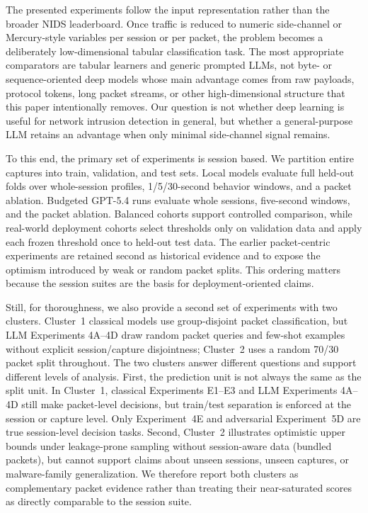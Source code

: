 \documentclass[letterpaper,twocolumn,10pt]{article}
\begin{document}
The presented experiments follow the input representation rather than the broader NIDS leaderboard. Once traffic is reduced to numeric side-channel or Mercury-style variables per session or per packet, the problem becomes a deliberately low-dimensional tabular classification task. The most appropriate comparators are tabular learners and generic prompted LLMs, not byte- or sequence-oriented deep models whose main advantage comes from raw payloads, protocol tokens, long packet streams, or other high-dimensional structure that this paper intentionally removes. Our question is not whether deep learning is useful for network intrusion detection in general, but whether a general-purpose LLM retains an advantage when only minimal side-channel signal remains.

To this end, the primary set of experiments is session based. We partition entire captures into train, validation, and test sets. Local models evaluate full held-out folds over whole-session profiles, 1/5/30-second behavior windows, and a packet ablation. Budgeted GPT-5.4 runs evaluate whole sessions, five-second windows, and the packet ablation. Balanced cohorts support controlled comparison, while real-world deployment cohorts select thresholds only on validation data and apply each frozen threshold once to held-out test data. The earlier packet-centric experiments are retained second as historical evidence and to expose the optimism introduced by weak or random packet splits. This ordering matters because the session suites are the basis for deployment-oriented claims. 

Still, for thoroughness, we also provide a second set of experiments with two clusters. Cluster~1 classical models use group-disjoint packet classification, but LLM Experiments 4A--4D draw random packet queries and few-shot examples without explicit session/capture disjointness; Cluster~2 uses a random 70/30 packet split throughout. The two clusters answer different questions and support different levels of analysis. First, the prediction unit is not always the same as the split unit. In Cluster~1, classical Experiments E1--E3 and LLM Experiments 4A--4D still make packet-level decisions, but train/test separation is enforced at the session or capture level. Only Experiment~4E and adversarial Experiment~5D are true session-level decision tasks. Second, Cluster~2 illustrates optimistic upper bounds under leakage-prone sampling without session-aware data (bundled packets), but cannot support claims about unseen sessions, unseen captures, or malware-family generalization. We therefore report both clusters as complementary packet evidence rather than treating their near-saturated scores as directly comparable to the session suite. 
\end{document}
